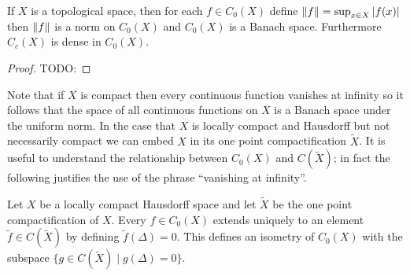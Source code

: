 \begin{prop}\label{BanachSpaceOfFunctionsVanishingAtInfinity}If $X$ is a topological space, then  for each $f \in C_0(X)$
  define $\left \lVert f \right \rVert = \sup_{x \in X} \left \vert f(x) \right \vert$ then $\left \lVert f \right \rVert$ is a
  norm on $C_0(X)$ and $C_0(X)$ is a Banach space.  Furthermore
  $C_c(X)$ is dense in $C_0(X)$.
\end{prop}
\begin{proof}
TODO:
\end{proof}

Note that if $X$ is compact then every continuous function vanishes at infinity so it follows that the space of 
all continuous functions on $X$ is a Banach space under the uniform norm.  In the case that $X$ is locally compact
and Hausdorff but not necessarily compact we can embed $X$ in its one point compactification $\tilde{X}$.  It is useful to understand
the relationship between $C_0(X)$ and $C(\tilde{X})$; in fact the following justifies the use of the phrase ``vanishing at infinity''.
\begin{prop}\label{IsometricEmbeddingVanishingAtInfinityIntoCompact}Let $X$ be a locally compact Hausdorff space and let $\tilde{X}$ be the one point compactification of $X$.  Every $f \in C_0(X)$ extends
uniquely to an element $\tilde{f} \in C(\tilde{X})$ by defining $\tilde{f}(\Delta) = 0$.  This defines an isometry of $C_0(X)$ with the subspace $\lbrace g \in C(\tilde{X}) \mid g(\Delta) = 0 \rbrace$.  
\end{prop}

